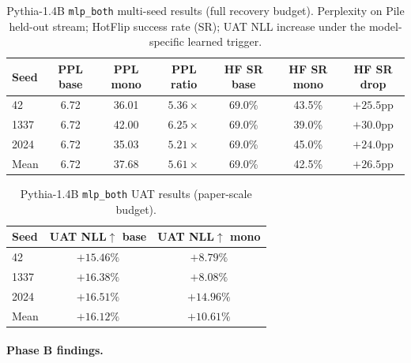 \documentclass{article}
\begin{document}
\begin{table}[h]
\caption{Pythia-1.4B \texttt{mlp\_both} multi-seed results (full recovery budget). Perplexity on Pile held-out stream; HotFlip success rate (SR); UAT NLL increase under the model-specific learned trigger.}
\label{tab:pythia-mlp-both-seeds}
\centering
\begin{tabular}{lcccccc}
\toprule
Seed & PPL base & PPL mono & PPL ratio & HF SR base & HF SR mono & HF SR drop \\
\midrule
42   & 6.72 & 36.01 & $5.36\times$ & 69.0\% & 43.5\% & $+25.5$pp \\
1337 & 6.72 & 42.00 & $6.25\times$ & 69.0\% & 39.0\% & $+30.0$pp \\
2024 & 6.72 & 35.03 & $5.21\times$ & 69.0\% & 45.0\% & $+24.0$pp \\
\midrule
Mean & 6.72 & 37.68 & $5.61\times$ & 69.0\% & 42.5\% & $+26.5$pp \\
\bottomrule
\end{tabular}
\end{table}

\begin{table}[h]
\caption{Pythia-1.4B \texttt{mlp\_both} UAT results (paper-scale budget).}
\label{tab:pythia-uat-seeds}
\centering
\begin{tabular}{lcc}
\toprule
Seed & UAT NLL$\uparrow$ base & UAT NLL$\uparrow$ mono \\
\midrule
42   & $+15.46\%$ & $+8.79\%$ \\
1337 & $+16.38\%$ & $+8.08\%$ \\
2024 & $+16.51\%$ & $+14.96\%$ \\
\midrule
Mean & $+16.12\%$ & $+10.61\%$ \\
\bottomrule
\end{tabular}
\end{table}

\paragraph{Phase B findings.}
\end{document}
